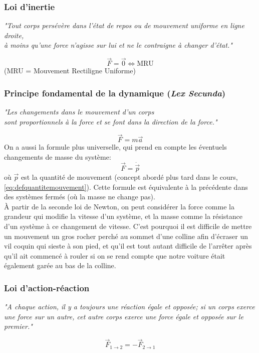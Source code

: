 \documentclass{article}
\numberwithin{equation}{section}
\begin{document}
\subsubsection{Loi d'inertie}
\begin{center}
	\emph{"Tout corps persévère dans l'état de repos ou de mouvement uniforme en ligne droite, \\
	 à moins qu'une force n'agisse sur lui et ne le contraigne à changer d'état."}
\end{center}
\begin{equation}
	\boxed{\vec F = \vec 0 \Leftrightarrow \text{MRU}}
\end{equation}
(MRU = Mouvement Rectiligne Uniforme)

\subsubsection{Principe fondamental de la dynamique (\emph{Lex Secunda})}
\begin{center}
	\emph{"Les changements dans le mouvement d'un corps \\ sont proportionnels à la force et se font dans la direction de la force."}
\end{center}
\begin{equation} \label{eq:lexsecunda}
	\boxed{\vec F = m \vec a}
\end{equation}
On a aussi la formule plus universelle, qui prend en compte les éventuels changements de masse du système:
\begin{equation*}
	\boxed{ \vec F = \dot{\vec p} }
\end{equation*}
où \(\vec p\) est la quantité de mouvement (concept abordé plus tard dans le cours, \ref{eq:defquantitemouvement}). Cette formule est équivalente à la précédente dans des systèmes fermés (où la masse ne change pas). \\

À partir de la seconde loi de Newton, on peut considérer la force comme la grandeur qui modifie la vitesse d'un système, et la masse comme la résistance d'un système à ce changement de vitesse. C'est pourquoi il est difficile de mettre un mouvement un gros rocher perché au sommet d'une colline afin d'écraser un vil coquin qui sieste à son pied, et qu'il est tout autant difficile de l'arrêter après qu'il ait commencé à rouler si on se rend compte que notre voiture était également garée au bas de la colline.

\subsubsection{Loi d'action-réaction} \label{sec:actionreaction}
\begin{center}
	\emph{"A chaque action, il y a toujours une réaction égale et opposée; si un corps exerce une force sur un autre, cet autre corps exerce une force égale et opposée sur le premier."}
\end{center}
\begin{equation}
	\boxed{\vec F_{1 \to 2} = - \vec F_{2 \to 1}}
\end{equation}
\end{document}
